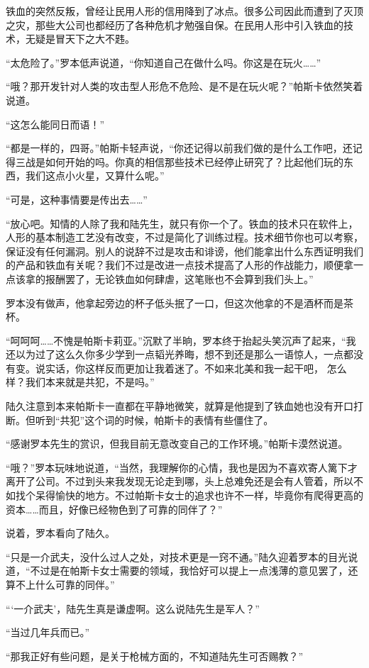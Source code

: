 铁血的突然反叛，曾经让民用人形的信用降到了冰点。很多公司因此而遭到了灭顶之灾，那些大公司也都经历了各种危机才勉强自保。在民用人形中引入铁血的技术，无疑是冒天下之大不韪。

“太危险了。”罗本低声说道，“你知道自己在做什么吗。你这是在玩火……”

“哦？那开发针对人类的攻击型人形危不危险、是不是在玩火呢？”帕斯卡依然笑着说道。

“这怎么能同日而语！”

“都是一样的，四哥。”帕斯卡轻声说，“你还记得以前我们做的是什么工作吧，还记得三战是如何开始的吗。你真的相信那些技术已经停止研究了？比起他们玩的东西，我们这点小火星，又算什么呢。”

“可是，这种事情要是传出去……”

“放心吧。知情的人除了我和陆先生，就只有你一个了。铁血的技术只在软件上，人形的基本制造工艺没有改变，不过是简化了训练过程。技术细节你也可以考察，保证没有任何漏洞。别人的说辞不过是攻击和诽谤，他们能拿出什么东西证明我们的产品和铁血有关呢？我们不过是改进一点技术提高了人形的作战能力，顺便拿一点该拿的报酬罢了，无论铁血如何肆虐，这笔账也不会算到我们头上。”

罗本没有做声，他拿起旁边的杯子低头抿了一口，但这次他拿的不是酒杯而是茶杯。

“呵呵呵……不愧是帕斯卡莉亚。”沉默了半晌，罗本终于抬起头笑沉声了起来，“我还以为过了这么久你多少学到一点韬光养晦，想不到还是那么一语惊人，一点都没有变。说实话，你这样反而更加让我着迷了。不如来北美和我一起干吧， 怎么样？我们本来就是共犯，不是吗。”

陆久注意到本来帕斯卡一直都在平静地微笑，就算是他提到了铁血她也没有开口打断。但听到“共犯”这个词的时候，帕斯卡的表情有些僵住了。

“感谢罗本先生的赏识，但我目前无意改变自己的工作环境。”帕斯卡漠然说道。

“哦？”罗本玩味地说道，“当然，我理解你的心情，我也是因为不喜欢寄人篱下才离开了公司。不过到头来我发现无论走到哪，头上总难免还是会有人管着，所以不如找个呆得愉快的地方。不过帕斯卡女士的追求也许不一样，毕竟你有爬得更高的资本……而且，好像已经物色到了可靠的同伴了？”

说着，罗本看向了陆久。

“只是一介武夫，没什么过人之处，对技术更是一窍不通。”陆久迎着罗本的目光说道，“不过是在帕斯卡女士需要的领域，我恰好可以提上一点浅薄的意见罢了，还算不上什么可靠的同伴。”

“‘一介武夫’，陆先生真是谦虚啊。这么说陆先生是军人？”

“当过几年兵而已。”

“那我正好有些问题，是关于枪械方面的，不知道陆先生可否赐教？”

